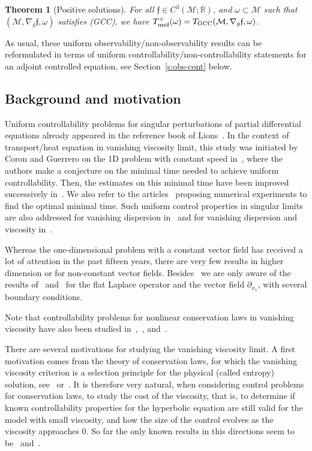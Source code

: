 \documentclass[JEP,XML,SOM,Unicode]{cedram}
\newcommand{\GCC}{\textup{GCC}}
\newcommand{\pGCC}{\textup{(GCC)}\xspace}
\newcommand{\unif}{\textup{unif}}
\newtheorem{theorem}[lemma]{Theorem}
\theoremstyle{definition}
\newcommand{\M}{\ensuremath{\mathcal M}}
\newcommand{\mb}[1]{\ensuremath{\mathbb{#1}}}
\newcommand{\R}{{\mb{R}}}
\newcommand{\f}{\ensuremath{\mathfrak{f}}}
\let\d\partial
\begin{document}
\begin{theorem}[Positive solutions]
\label{t:positive-intro}
For all $\f \in C^3(\M;\R)$, and $\omega \subset \M$ such that $(\M,\nabla_g\f,\omega)$ satisfies \pGCC, we have $T_{\unif}^+(\omega) = T_{\GCC}(\M,\nabla_g\f,\omega)$.
\end{theorem}

As usual, these uniform observability/non-observability results can be reformulated in terms of uniform controllability/non-controllability statements for an adjoint controlled equation, see Section~\ref{s:obs-cont} below.

\subsection{Background and motivation}
\label{s:motiv}
Uniform controllability problems for singular perturbations of partial differential equations already appeared in the reference book of Lions~\cite[Chap.\,3]{Lio2:88}. In the context of transport/heat equation in vanishing viscosity limit, this study was initiated by Coron and Guerrero on the 1D problem with constant speed in~\cite{CG:05}, where the authors make a conjecture on the minimal time needed to achieve uniform controllability. Then, the estimates on this minimal time have been improved successively in~\cite{Gla:10,Lissy:12,Lissy:14,Lissy:15}.
We also refer to the arti\-cles~\cite{Munch:18,YM:19,YM:19bis} proposing numerical experiments to find the optimal minimal time.
Such uniform control properties in singular limits are also addressed for vanishing dispersion in~\cite{GG:08} and for vanishing dispersion and viscosity in~\cite{GG:09}.

Whereas the one-dimensional problem with a constant vector field has received a lot of attention in the past fifteen years, there are very few results in higher dimension or for non-constant vector fields. Besides~\cite{GL:07} we are only aware of the results of~\cite{Barcena:20} and~\cite{Barcena:21} for the flat Laplace operator and the vector field $\d_{x_1}$, with several boundary conditions.

Note that controllability problems for nonlinear conservation laws in vanishing viscosity have also been studied in~\cite{GG:07},~\cite{Lea:11}, and~\cite{Marbach:14}.

There are several motivations for studying the vanishing viscosity limit.
A first motivation comes from the theory of conservation laws, for which the vanishing viscosity criterion is a selection principle for the physical (called entropy) solution, see~\cite{Kru:70} or~\cite[Chap.\,6]{Daf:00}.
It is therefore very natural, when considering control problems for conservation laws, to study the cost of the viscosity,
that is, to determine if known controllability properties for the hyperbolic equation are still valid for the model with
small viscosity, and how the size of the control evolves as the viscosity approaches $0$. So far the only known results in this directions seem to be~\cite{GG:07} and~\cite{Lea:11}.
\end{document}
